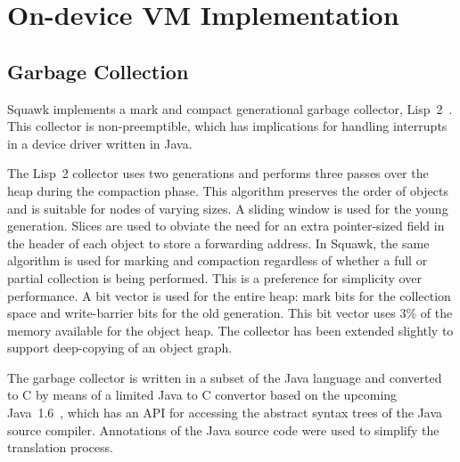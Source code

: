 \documentclass{sigplanconf}
\begin{document}
\section{On-device VM Implementation}
\label{sec-execution-engine}

\subsection{Garbage Collection}
\label{sec-gc}

Squawk implements a mark and compact generational garbage collector, 
Lisp~2~\cite{Jone96}.
This collector is non-preemptible, which has implications for
handling interrupts in a device driver written in Java.  


The Lisp~2 collector uses two generations and performs three passes over the 
heap during the compaction phase.  This algorithm preserves the order of 
objects and is suitable for nodes of varying sizes. 
A sliding window is used for the young generation.  
Slices are used to obviate the need for an extra pointer-sized field in the
header of each object to store a forwarding address.
In Squawk, the same algorithm is used for marking and compaction regardless
of whether a full or partial collection is being performed.  This is a
preference for simplicity over performance. 
A bit vector is used for the entire heap: mark bits for the collection space
and write-barrier bits for the old generation.  This bit vector uses 3\% 
of the memory available for the object heap.
The collector has been extended slightly to support deep-copying of an object
graph. 


The garbage collector is written in a subset of the Java 
language and converted to C by means of a limited Java to C convertor 
based on the upcoming Java~1.6~\cite{Mustang}, which has an API for 
accessing the abstract syntax trees of the Java source compiler.
Annotations of the Java source code were used to simplify
the translation process. 
\end{document}
